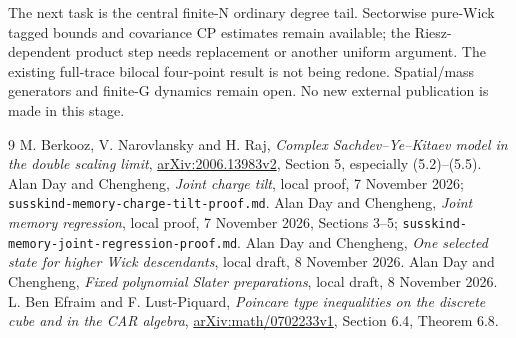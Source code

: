 \documentclass[11pt]{article}
\begin{document}
The next task is the central finite-N ordinary degree tail. Sectorwise
pure-Wick tagged bounds and covariance CP estimates remain available;
the Riesz-dependent product step needs replacement or another uniform
argument. The existing full-trace bilocal four-point result is not
being redone. Spatial/mass generators and finite-G dynamics remain
open. No new external publication is made in this stage.

\begin{thebibliography}{9}
 M. Berkooz, V. Narovlansky and H. Raj,
\emph{Complex Sachdev--Ye--Kitaev model in the double scaling limit},
\href{https://arxiv.org/abs/2006.13983}{arXiv:2006.13983v2},
Section 5, especially (5.2)--(5.5).
 Alan Day and Chengheng, \emph{Joint charge tilt},
local proof, 7 November 2026;
\texttt{susskind-memory-charge-tilt-proof.md}.
 Alan Day and Chengheng, \emph{Joint memory regression},
local proof, 7 November 2026, Sections 3--5;
\texttt{susskind-memory-joint-regression-proof.md}.
 Alan Day and Chengheng, \emph{One selected state for
higher Wick descendants}, local draft, 8 November 2026.
 Alan Day and Chengheng, \emph{Fixed polynomial Slater
preparations}, local draft, 8 November 2026.
 L. Ben Efraim and F. Lust-Piquard,
\emph{Poincare type inequalities on the discrete cube and in the CAR algebra},
\href{https://arxiv.org/abs/math/0702233}{arXiv:math/0702233v1},
Section 6.4, Theorem 6.8.
\end{thebibliography}
\end{document}
